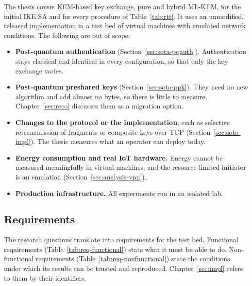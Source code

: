 The thesis covers KEM-based key exchange, pure and hybrid ML-KEM, for the
initial IKE SA and for every procedure of Table~\ref{tab:rtt}. It uses an
unmodified, released implementation in a test bed of virtual machines with
emulated network conditions. The following are out of scope:
\begin{itemize}
    \item \textbf{Post-quantum authentication}
    (Section~\ref{sec:sota-pqauth}). Authentication stays classical and
    identical in every configuration, so that only the key exchange varies.
    \item \textbf{Post-quantum preshared keys} (Section~\ref{sec:sota-ppk}).
    They need no new algorithm and add almost no bytes, so there is little to
    measure. Chapter~\ref{sec:reco} discusses them as a migration option.
    \item \textbf{Changes to the protocol or the implementation}, such as
    selective retransmission of fragments or composite keys over TCP
    (Section~\ref{sec:sota-impl}). The thesis measures what an operator can
    deploy today.
    \item \textbf{Energy consumption and real IoT hardware.} Energy cannot be
    measured meaningfully in virtual machines, and the resource-limited
    initiator is an emulation (Section~\ref{sec:analysis-vpn}).
    \item \textbf{Production infrastructure.} All experiments run in an
    isolated lab.
\end{itemize}

\subsection{Requirements}
\label{sec:analysis-requirements}

The research questions translate into requirements for the test bed.
Functional requirements (Table~\ref{tab:req-functional}) state what it must be
able to do. Non-functional requirements (Table~\ref{tab:req-nonfunctional})
state the conditions under which its results can be trusted and reproduced.
Chapter~\ref{sec:impl} refers to them by their identifiers.

